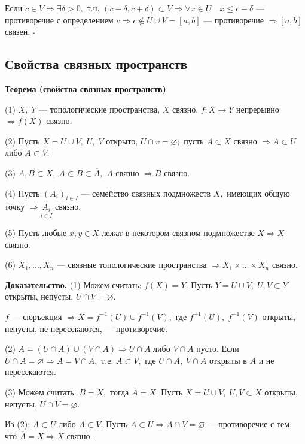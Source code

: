 \documentclass[12pt,a4paper]{article}
\begin{document}
Если $c \in V \Rightarrow \exists \delta > 0,$ т.ч. $(c - \delta, c + \delta) \subset V \Rightarrow \forall x \in U \quad x \leq c - \delta$ --- противоречие с определением $c \Rightarrow c \not \in U \cup V = [a, b]$ --- противоречие $\Rightarrow [a, b]$ связен. $\square$ 

\subsection{Свойства связных пространств}

\textbf{Теорема (свойства связных пространств)}

(1) $X, \; Y$ --- топологические пространства, $X$ связно, $f\!\!: X \to Y$ непрерывно $\Rightarrow f(X)$ связно. 

(2) Пусть $X = U \cup V, \; U, \; V$ открыто, $U \cap v = \varnothing;$ пусть $A \subset X$ связно $\Rightarrow A \subset U$ либо $A \subset V.$ 

(3) $A, B \subset X, \; A \subset B \subset \overline{A},$ $A$ связно $\Rightarrow B$ связно.

(4) Пусть $(A_{i})_{i \in I}$ --- семейство связных подмножеств $X,$ имеющих общую точку $\Rightarrow \underset{i \in I}{A_{i}}$ связно.

(5) Пусть любые $x, y \in X$ лежат в некотором связном подмножестве $X \Rightarrow X$ связно. 

(6) $X_{1}, ..., X_{n}$ --- связные топологические пространства $\Rightarrow X_{1} \times ... \times X_{n}$ связно.

\textbf{Доказательство.} (1) Можем считать: $f(X) = Y.$ Пусть $Y = U \cup V, \; U, V \subset Y$ открыты, непусты, $U \cap V = \varnothing.$ 

$f$ --- сюръекция $\Rightarrow X = f^{-1}(U) \cup f^{-1}(V),$ где $f^{-1}(U), \;  f^{-1}(V)$ открыты, непусты, не пересекаются, --- противоречие. 

(2) $A = (U \cap A) \cup (V \cap A) \Rightarrow U \cap A$ либо $V \cap A$ пусто. Если $U \cap A = \varnothing \Rightarrow A = V \cap A,$ т.е. $A \subset V,$ где $U \cap A, \; V \cap A$ открыты в $A$ и не пересекаются. 

(3) Можем считать: $B = X,$ тогда $\overline{A} = X.$ Пусть $X = U \cup V, \; U, V \subset X$ открыты, непусты, $U \cap V = \varnothing.$

Из (2): $A \subset U$ либо $A \subset V.$ Пусть $A \subset U \Rightarrow A \cap V = \varnothing$ --- противоречие с тем, что $\overline{A} = X \Rightarrow X$ связно.
\end{document}
